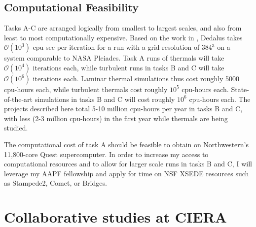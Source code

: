 \documentclass[aasms,11pt]{article}
\makeatletter
\renewcommand{\sectionmark}[1]{%
  \markboth{\ifnum \c@secnumdepth>\z@
      \thesection: \hskip 1em\relax
    \fi #1}{}}
\makeatother
\begin{document}
\subsection{Computational Feasibility}
\label{sct:feasibility}
Tasks A-C are arranged logically from smallest to largest scales, and also from least to most computationally expensive.
Based on the work in \citet{anders&brown2017, anders&all2018, anders&all2019, andersLB2019}, Dedalus takes $\mathcal{O}(10^3)$ cpu-sec per iteration for a run with a grid resolution of 384$^3$ on a system comparable to NASA Pleiades.
Task A runs of thermals will take $\mathcal{O}(10^4)$ iterations each, while turbulent runs in tasks B and C will take $\mathcal{O}(10^6)$ iterations each.
Laminar thermal simulations thus cost roughly 5000 cpu-hours each, while turbulent thermals cost roughly $10^5$ cpu-hours each.
State-of-the-art simulations in tasks B and C will cost roughly $10^6$ cpu-hours each.
The projects described here total 5-10 million cpu-hours per year in tasks B and C, with less (2-3 million cpu-hours) in the first year while thermals are being studied.

The computational cost of task A should be feasible to obtain on Northwestern's 11,800-core Quest supercomputer.
In order to increase my access to computational resources and to allow for larger scale runs in tasks B and C, I will leverage my AAPF fellowship and apply for time on NSF XSEDE resources such as Stampede2, Comet, or Bridges.


\section{Collaborative studies at CIERA}
\sectionmark{CIERA}
\vspace{-6pt}
\end{document}
